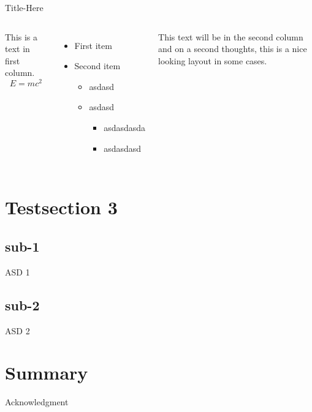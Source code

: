 \documentclass[aspectratio=169]{beamer}
\begin{document}
\begin{frame}{Title-Here}
    \begin{columns}
            This is a text in first column.
            $$E=mc^2$$
            \begin{itemize}
                \item First item
                \item Second item
                \begin{itemize}
                    \item asdasd
                    \item asdasd
                    \begin{itemize}
                        \item asdasdasda
                        \item asdasdasd
                    \end{itemize}
                \end{itemize}
            \end{itemize}
        
            This text will be in the second column
            and on a second thoughts, this is a nice looking
            layout in some cases.
    \end{columns}
\end{frame}

\section{Testsection 3}
\subsection{sub-1}
\begin{frame}{ASD 1}
\end{frame}

\subsection{sub-2}
\begin{frame}{ASD 2}
\end{frame}


\section{Summary}

{
    \begin{frame}{Acknowledgment}

    \end{frame}
}
\end{document}
